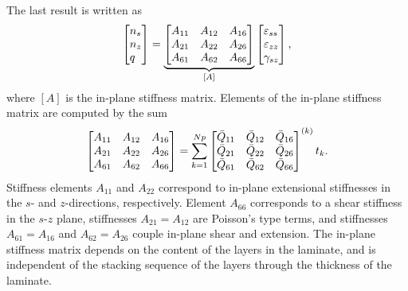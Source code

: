 \documentclass{AeroStructure-ERJohnson}
\begin{document}
The last result is written as
\begin{align}\label{eq8.35}
\left[\begin{array}{@{}l@{}} n_{s}\\
n_{z}\\
q
\end{array}\right]=\underbrace{\left[\begin{array}{@{}lll@{}} A_{11} &
A_{12} & A_{16}\\
A_{21} & A_{22} & A_{26}\\
A_{61} & A_{62} &
A_{66} \end{array}\right]}_{[A]}\left[\begin{array}{@{}l@{}}
\varepsilon_{s s}\\
\varepsilon_{z z}\\
\gamma_{s z}
\end{array}\right],
\end{align}
where $[A]$ is the in-plane stiffness matrix. Elements of the
in-plane stiffness matrix are computed by the sum
\begin{align}\label{eq8.36}
\left[\begin{array}{@{}lll@{}} A_{11} & A_{12} & A_{16}\\
A_{21} &
A_{22} & A_{26}\\
A_{61} & A_{62} & A_{66}
\end{array}\right]=\sum_{k=1}^{N p}\left[\begin{array}{@{}lll@{}}
\bar{Q}_{11} & \bar{Q}_{12} & \bar{Q}_{16}\\
\bar{Q}_{21} &
\bar{Q}_{22} & \bar{Q}_{26}\\
\bar{Q}_{61} & \bar{Q}_{62} &
\bar{Q}_{66} \end{array}\right]^{(k)} t_{k}.
\end{align}
Stiffness elements $A_{11}$ and $A_{22}$ correspond to in-plane
extensional stiffnesses in the $s$- and $z$-directions,
respectively. Element $A_{66}$ corresponds to a shear stiffness in
the $s$-$z$ plane, stiffnesses $A_{21}=A_{12}$ are Poisson's type
terms, and stiffnesses $A_{61}=A_{16}$ and $A_{62}=A_{26}$ couple
in-plane shear and extension. The in-plane stiffness matrix
depends on the content of the layers in the laminate, and is
independent of the stacking sequence of the layers through the
thickness of the laminate.
\end{document}
